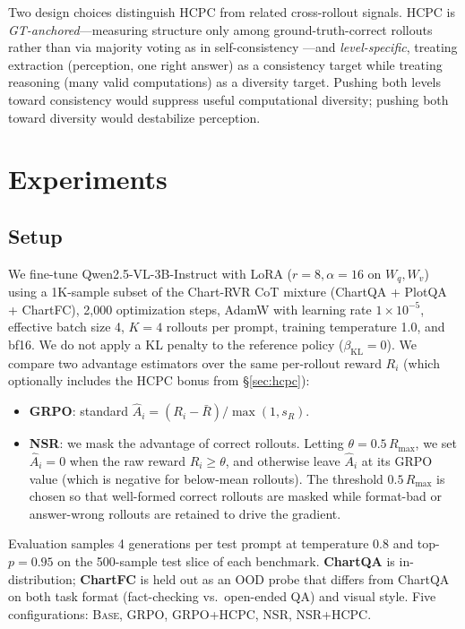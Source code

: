 \documentclass[11pt]{article}
\begin{document}
Two design choices distinguish HCPC from related cross-rollout
signals. HCPC is \emph{GT-anchored}---measuring structure only among
ground-truth-correct rollouts rather than via majority voting as in
self-consistency \citep{wang2022sc}---and \emph{level-specific},
treating extraction (perception, one right answer) as a consistency
target while treating reasoning (many valid computations) as a
diversity target. Pushing both levels toward consistency would
suppress useful computational diversity; pushing both toward
diversity would destabilize perception.

\section{Experiments}
\label{sec:experiments}

\subsection{Setup}
\label{sec:setup}

We fine-tune Qwen2.5-VL-3B-Instruct with LoRA
($r{=}8,\alpha{=}16$ on $W_q,W_v$) using a 1K-sample subset of the
Chart-RVR CoT mixture (ChartQA + PlotQA + ChartFC), 2{,}000
optimization steps, AdamW with learning rate $1\!\times\!10^{-5}$,
effective batch size 4, $K{=}4$ rollouts per prompt, training
temperature 1.0, and bf16. We do not apply a KL penalty to the
reference policy ($\beta_{\text{KL}}{=}0$). We compare two advantage
estimators over the same per-rollout reward $R_i$ (which optionally
includes the HCPC bonus from \S\ref{sec:hcpc}):
\begin{itemize}
    \item \textbf{GRPO}: standard
    $\hat A_i = (R_i - \bar R)/\max(1, s_R)$.
    \item \textbf{NSR}: we mask the advantage of correct rollouts.
    Letting
    $\theta = 0.5\,R_{\max}$,
    we set $\hat A_i = 0$ when the raw reward $R_i \geq \theta$, and
    otherwise leave $\hat A_i$ at its GRPO value
    (which is negative for below-mean rollouts). The threshold
    $0.5\,R_{\max}$ is chosen so that well-formed correct rollouts
    are masked while format-bad or answer-wrong rollouts are retained
    to drive the gradient.
\end{itemize}
Evaluation samples 4 generations per test prompt at temperature 0.8
and top-$p{=}0.95$ on the 500-sample test slice of each benchmark.
\textbf{ChartQA} \citep{chartqa} is in-distribution; \textbf{ChartFC}
\citep{chartfc} is held out as an OOD probe that differs from ChartQA
on both task format (fact-checking vs.\ open-ended QA) and visual
style. Five configurations: \textsc{Base}, \textsc{GRPO},
\textsc{GRPO+HCPC}, \textsc{NSR}, \textsc{NSR+HCPC}.
\end{document}
